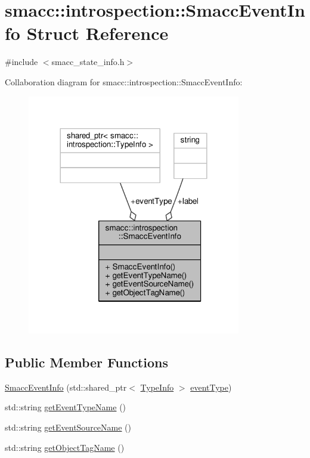 \hypertarget{structsmacc_1_1introspection_1_1SmaccEventInfo}{}\section{smacc\+:\+:introspection\+:\+:Smacc\+Event\+Info Struct Reference}
\label{structsmacc_1_1introspection_1_1SmaccEventInfo}


{\ttfamily \#include $<$smacc\+\_\+state\+\_\+info.\+h$>$}



Collaboration diagram for smacc\+:\+:introspection\+:\+:Smacc\+Event\+Info\+:\nopagebreak
\begin{figure}[H]
\begin{center}
\leavevmode
\includegraphics[width=264pt]{structsmacc_1_1introspection_1_1SmaccEventInfo__coll__graph}
\end{center}
\end{figure}
\subsection*{Public Member Functions}
\begin{DoxyCompactItemize}
\item 
\hyperlink{structsmacc_1_1introspection_1_1SmaccEventInfo_a322035851e387c9cb58bc1cfe4c68544}{Smacc\+Event\+Info} (std\+::shared\+\_\+ptr$<$ \hyperlink{classsmacc_1_1introspection_1_1TypeInfo}{Type\+Info} $>$ \hyperlink{structsmacc_1_1introspection_1_1SmaccEventInfo_af3bdf1abf797864e681662d92a5515f9}{event\+Type})
\item 
std\+::string \hyperlink{structsmacc_1_1introspection_1_1SmaccEventInfo_ae0ed6a9506dbe526269a0bd956a71044}{get\+Event\+Type\+Name} ()
\item 
std\+::string \hyperlink{structsmacc_1_1introspection_1_1SmaccEventInfo_af9e90a557f8f62069a17234f79bcefa0}{get\+Event\+Source\+Name} ()
\item 
std\+::string \hyperlink{structsmacc_1_1introspection_1_1SmaccEventInfo_a0aa5d15822e7642079f375ee0f4ff096}{get\+Object\+Tag\+Name} ()
\end{DoxyCompactItemize}
